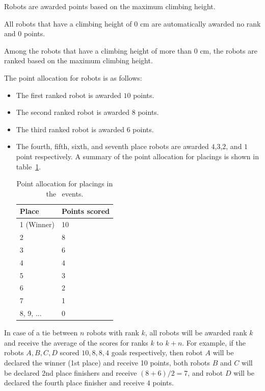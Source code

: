 \documentclass[12pt]{hurocup}
\begin{document}
\begin{lawlist}[CW]

\item Robots are awarded points based on the maximum climbing height.

\item All robots that have a climbing height of $0$ cm are
  automatically awarded no rank and $0$ points.

\item Among the robots that have a climbing height of more than $0$ cm,
  the robots are ranked based on the maximum climbing height.

\item The point allocation for robots is as follows:
  \begin{itemize}
  \item The first ranked robot is awarded $10$ points.
  \item The second ranked robot is awarded $8$ points.
  \item The third ranked robot is awarded $6$ points.
  \item The fourth, fifth, sixth, and seventh place robots are awarded
    $4$,$3$,$2$, and $1$ point respectively.  A summary of the point
    allocation for placings is shown in table~\ref{point-allocation}.

    \begin{table}
      \begin{center}
        \begin{tabular}{l|l}
          \hline
          Place & Points scored \\
          \hline
          1 (Winner) & 10 \\
          2          & 8 \\
          3          & 6 \\
          4          & 4 \\
          5          & 3 \\
          6          & 2 \\
          7          & 1 \\
          8, 9, ...  & 0 \\
          \hline
        \end{tabular}
      \end{center}
      \caption{Point allocation for placings in the \HuroCup\ events.}
      \label{point-allocation}
    \end{table}
  \end{itemize}

\item In case of a tie between $n$ robots with rank $k$, all robots
 will be awarded rank $k$ and receive the average of the scores for
 ranks $k$ to $k+n$.  For example, if the robots $A,B,C,D$ scored $10,
 8, 8, 4$ goals respectively, then robot $A$ will be declared the
 winner (1st place) and receive 10 points, both robots $B$ and $C$
 will be declared 2nd place finishers and receive $(8+6)/2=7$, and
 robot $D$ will be declared the fourth place finisher and receive $4$
 points.

\end{lawlist}
\end{document}
